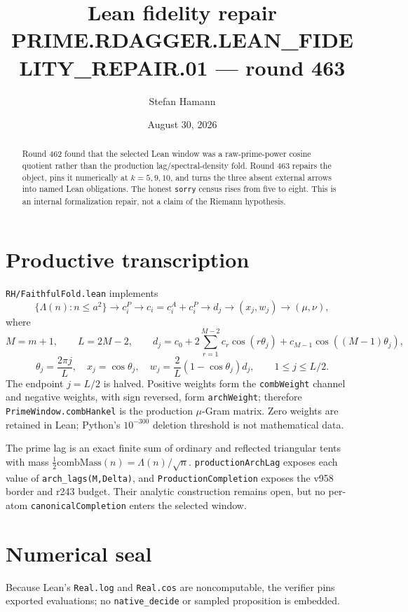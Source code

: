 \documentclass[10pt]{article}
\title{\bfseries Lean fidelity repair\\[1mm]
\large PRIME.RDAGGER.LEAN\_FIDELITY\_REPAIR.01 --- round 463}
\author{Stefan Hamann}
\date{August 30, 2026}
\newcommand{\code}[1]{\nolinkurl{#1}}
\begin{document}
\maketitle

\begin{abstract}
Round 462 found that the selected Lean window was a raw-prime-power
cosine quotient rather than the production lag/spectral-density fold.
Round 463 repairs the object, pins it numerically at $k=5,9,10$, and
turns the three absent external arrows into named Lean obligations.
The honest \texttt{sorry} census rises from five to eight.  This is an
internal formalization repair, not a claim of the Riemann hypothesis.
\end{abstract}

\section{Productive transcription}
\code{RH/FaithfulFold.lean} implements
\[
\{\Lambda(n):n\le a^2\}
\longrightarrow c^P_i
\longrightarrow c_i=c^A_i+c^P_i
\longrightarrow d_j
\longrightarrow (x_j,w_j)
\longrightarrow(\mu,\nu),
\]
where
\[
 M=m+1,\qquad L=2M-2,\qquad
d_j=c_0+2\sum_{r=1}^{M-2}c_r\cos(r\theta_j)
       +c_{M-1}\cos((M-1)\theta_j),
\]
\[
\theta_j=\frac{2\pi j}{L},\quad
x_j=\cos\theta_j,\quad
w_j=\frac{2}{L}(1-\cos\theta_j)d_j ,
\qquad 1\le j\le L/2.
\]
The endpoint $j=L/2$ is halved.  Positive weights form the
\code{combWeight} channel and negative weights, with sign reversed,
form \code{archWeight}; therefore \code{PrimeWindow.combHankel} is
the production $\mu$-Gram matrix.  Zero weights are retained in Lean;
Python's $10^{-300}$ deletion threshold is not mathematical data.

The prime lag is an exact finite sum of ordinary and reflected
triangular tents with mass
$\tfrac12\mathrm{combMass}(n)=\Lambda(n)/\sqrt n$.
\code{productionArchLag} exposes each value of
\code{arch_lags(M,Delta)}, and \code{ProductionCompletion} exposes
the v958 border and r243 budget.  Their analytic construction remains
open, but no per-atom \code{canonicalCompletion} enters the selected
window.

\section{Numerical seal}
Because Lean's \code{Real.log} and \code{Real.cos} are noncomputable,
the verifier pins exported evaluations; no \code{native_decide} or
sampled proposition is embedded.
\end{document}
